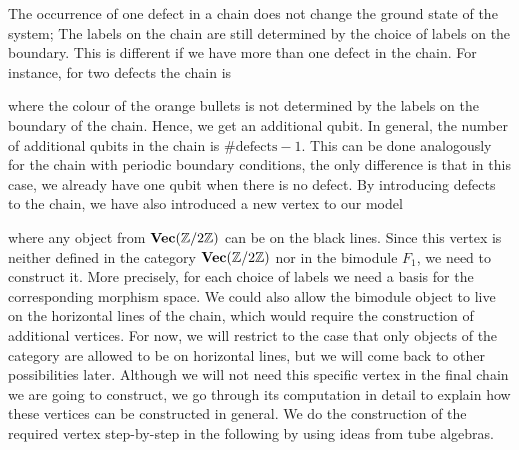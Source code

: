 The occurrence of one defect in a chain does not change the ground state of the system; The labels on the chain are still determined by the choice of labels on the boundary. This is different if we have more than one defect in the chain. For instance, for two defects the chain is
	\begin{figure}[H]
	\end{figure}
\noindent
where the colour of the orange bullets is not determined by the labels on the boundary of the chain. Hence, we get an additional qubit. In general, the number of additional qubits in the chain is $\#\mathrm{defects}-1$. This can be done analogously for the chain with periodic boundary conditions, the only difference is that in this case, we already have one qubit when there is no defect. By introducing defects to the chain, we have also introduced a new vertex to our model
	\begin{figure}[H]	
	\end{figure}
\noindent
where any object from $\textbf{Vec}(\mathbb{Z}/2\mathbb{Z})$ can be on the black lines. Since this vertex is neither defined in the category $\textbf{Vec}(\mathbb{Z}/2\mathbb{Z})$ nor in the bimodule $F_1$, we need to construct it. More precisely, for each choice of labels we need a basis for the corresponding morphism space. We could also allow the bimodule object to live on the horizontal lines of the chain, which would require the construction of additional vertices. For now, we will restrict to the case that only objects of the category are allowed to be on horizontal lines, but we will come back to other possibilities later. Although we will not need this specific vertex in the final chain we are going to construct, we go through its computation in detail to explain how these vertices can be constructed in general. We do the construction of the required vertex step-by-step in the following by using ideas from tube algebras. 

